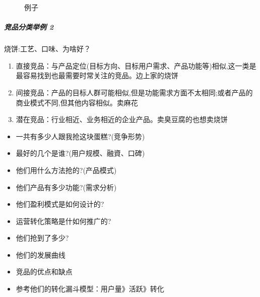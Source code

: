 \documentclass[letterpaper,10pt,english]{sphinxmanual}
\begin{document}
\begin{figure}[H]
\centering
\capstart

\noindent{}
\caption{例子}\label{\detokenize{chapter_knowledge/goods_analysis:id33}}\end{figure}


\subparagraph{竞品分类举例 2\sphinxfootnotemark[528]}
\label{\detokenize{chapter_knowledge/goods_analysis:id16}}%
\begin{footnotetext}[528]\sphinxAtStartFootnote
{}
%
\end{footnotetext}\ignorespaces 
烧饼:工艺、口味、为啥好？
\begin{enumerate}
%
\item {} 
直接竞品：与产品定位(目标方向、目标用户需求、产品功能等)相似,这一类是最容易找到也最需要时常关注的竞品。边上家的烧饼

\item {} 
间接竞品：产品的目标人群可能相似,但是功能需求方面不太相同;或者产品的商业模式不同,但其他内容相似。卖麻花

\item {} 
潜在竞品：行业相近、业务相近的企业产品。卖臭豆腐的也想卖烧饼

\end{enumerate}
\begin{itemize}
\item {} 
一共有多少人跟我抢这块蛋糕?(竞争形势)

\item {} 
最好的几个是谁?(用户规模、融資、口碑)

\item {} 
他们用什么方法抢的?(产品模式)

\item {} 
他们产品有多少功能?(需求分析)

\item {} 
他们盈利模式是如何设计的?

\item {} 
运营转化策略是什如何推广的?

\item {} 
他们抢到了多少?

\item {} 
他们的发展曲线

\item {} 
竞品的优点和缺点

\item {} 
参考他们的转化漏斗模型：用户量\sphinxhyphen{}》活跃\sphinxhyphen{}》转化

\end{itemize}
\end{document}
